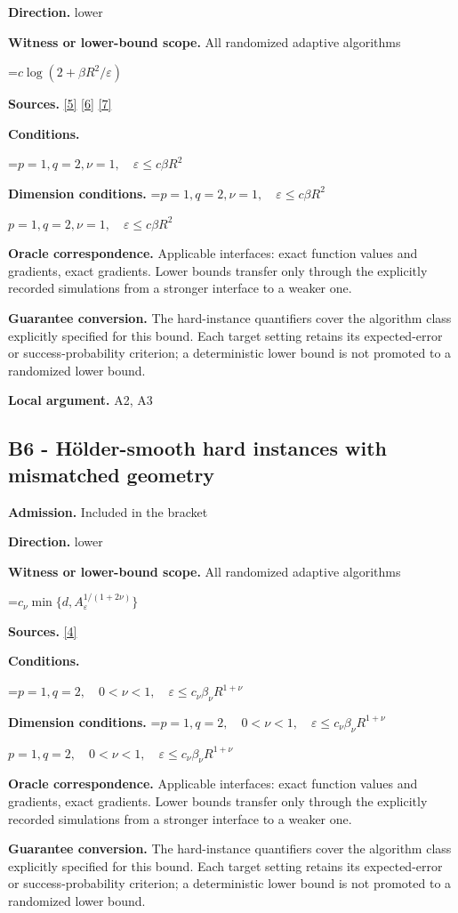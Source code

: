 \documentclass[10pt,a4paper]{article}
\newcommand{\AtlasMath}[1]{\par\begingroup\centering\setbox0=\hbox{$\displaystyle #1$}\ifdim\wd0>1.4\linewidth\typeout{ATLAS WIDE FORMULA: \the\wd0}\fi\ifdim\wd0>\linewidth\resizebox{\linewidth}{!}{\box0}\else\box0\fi\par\endgroup}
\newcommand{\AtlasInlineMath}[1]{\begingroup\setbox0=\hbox{$#1$}\ifdim\wd0>.4\linewidth\endgroup\AtlasMath{#1}\else\endgroup$#1$\fi}
\begin{document}
\textbf{Direction.} lower

\textbf{Witness or lower-bound scope.} All randomized adaptive algorithms

\AtlasMath{c\log(2+\beta R^2/\varepsilon)}
\textbf{Sources.} \href{https://arxiv.org/pdf/2101.09740v2}{[5]} \href{https://arxiv.org/pdf/2609.33360v2}{[6]} \href{https://arxiv.org/pdf/2609.10874}{[7]}

\textbf{Conditions.} 
\AtlasMath{p=1,q=2,\nu=1,\quad\varepsilon\le c\beta R^2}


\textbf{Dimension conditions.} \AtlasInlineMath{p=1,q=2,\nu=1,\quad\varepsilon\le c\beta R^2}

\textbf{Oracle correspondence.} Applicable interfaces: exact function values and gradients, exact gradients. Lower bounds transfer only through the explicitly recorded simulations from a stronger interface to a weaker one.

\textbf{Guarantee conversion.} The hard-instance quantifiers cover the algorithm class explicitly specified for this bound. Each target setting retains its expected-error or success-probability criterion; a deterministic lower bound is not promoted to a randomized lower bound.

\textbf{Local argument.} A2, A3

\subsection{B6 - Hölder-smooth hard instances with mismatched geometry}
\textbf{Admission.} Included in the bracket

\textbf{Direction.} lower

\textbf{Witness or lower-bound scope.} All randomized adaptive algorithms

\AtlasMath{c_\nu\min\{d,A_\varepsilon^{1/(1+2\nu)}\}}
\textbf{Sources.} \href{https://arxiv.org/pdf/2609.32910}{[4]}

\textbf{Conditions.} 
\AtlasMath{p=1,q=2,\quad0<\nu<1,\quad\varepsilon\le c_\nu\beta_\nu R^{1+\nu}}


\textbf{Dimension conditions.} \AtlasInlineMath{p=1,q=2,\quad0<\nu<1,\quad\varepsilon\le c_\nu\beta_\nu R^{1+\nu}}

\textbf{Oracle correspondence.} Applicable interfaces: exact function values and gradients, exact gradients. Lower bounds transfer only through the explicitly recorded simulations from a stronger interface to a weaker one.

\textbf{Guarantee conversion.} The hard-instance quantifiers cover the algorithm class explicitly specified for this bound. Each target setting retains its expected-error or success-probability criterion; a deterministic lower bound is not promoted to a randomized lower bound.
\end{document}
